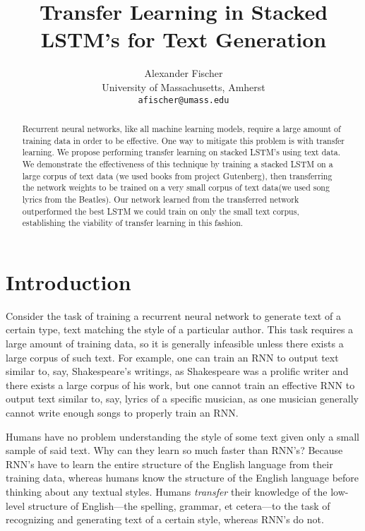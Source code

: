 \documentclass[10pt,twocolumn,letterpaper]{article}
\begin{document}
\title{Transfer Learning in Stacked LSTM's for Text Generation}

\author{Alexander Fischer\\
University of Massachusetts, Amherst\\
{\tt\small afischer@umass.edu}
}

\maketitle

\begin{abstract}
   Recurrent neural networks, like all machine learning models, require a large amount of training data in order to be effective. One way to mitigate this problem is with transfer learning. We propose performing transfer learning on stacked LSTM's using text data. We demonstrate the effectiveness of this technique by training a stacked LSTM on a large corpus of text data (we used books from project Gutenberg), then transferring the network weights to be trained on a very small corpus of text data(we used song lyrics from the Beatles). Our network learned from the transferred network outperformed the best LSTM we could train on only the small text corpus, establishing the viability of transfer learning in this fashion.
\end{abstract}

\section{Introduction}
	Consider the task of training a recurrent neural network to generate text of a certain type, \eg text matching the style of a particular author. This task requires a large amount of training data, so it is generally infeasible unless there exists a large corpus of such text. For example, one can train an RNN to output text similar to, say, Shakespeare's writings, as Shakespeare was a prolific writer and there exists a large corpus of his work, but one cannot train an effective RNN to output text similar to, say, lyrics of a specific musician, as one musician generally cannot write enough songs to properly train an RNN.
	
	Humans have no problem understanding the style of some text given only a small sample of said text. Why can they learn so much faster than RNN's? Because RNN's have to learn the entire structure of the English language from their training data, whereas humans know the structure of the English language before thinking about any textual styles. Humans {\em transfer} their knowledge of the low-level structure of English---the spelling, grammar, et cetera---to the task of recognizing and generating text of a certain style, whereas RNN's do not.
	
\end{document}
